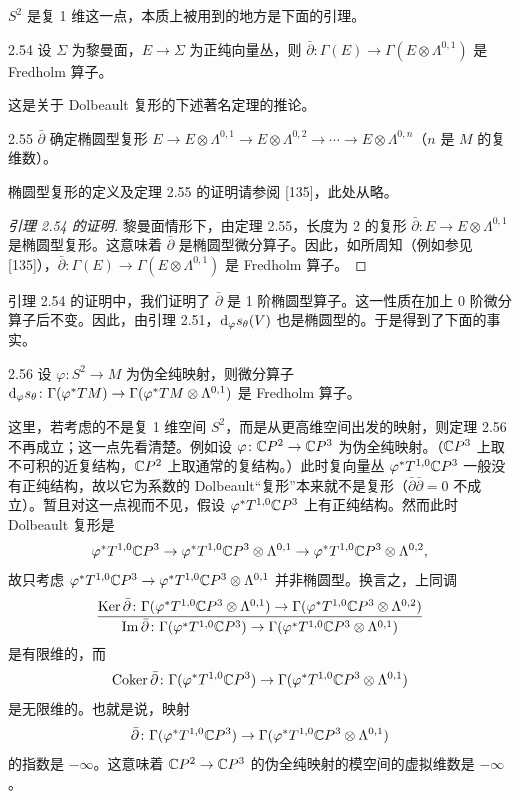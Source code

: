 $S^2$ 是复 1 维这一点，本质上被用到的地方是下面的引理。

\begin{lemma}{2.54}
  设 $\Sigma$ 为黎曼面，$E\to\Sigma$ 为正纯向量丛，则 $\bar\partial\colon\Gamma(E)\to\Gamma(E\otimes\Lambda^{0,1})$ 是 Fredholm 算子。
\end{lemma}

这是关于 Dolbeault 复形的下述著名定理的推论。

\begin{theorem}{2.55}
  $\bar\partial$ 确定椭圆型复形 $E\to E\otimes\Lambda^{0,1}\to E\otimes\Lambda^{0,2}\to\cdots\to E\otimes\Lambda^{0,n}$（$n$ 是 $M$ 的复维数）。
\end{theorem}

椭圆型复形的定义及定理 2.55 的证明请参阅 [135]，此处从略。

\begin{proof}[引理 2.54 的证明]
  黎曼面情形下，由定理 2.55，长度为 2 的复形 $\bar\partial\colon E\to E\otimes\Lambda^{0,1}$ 是椭圆型复形。这意味着 $\bar\partial$ 是椭圆型微分算子。因此，如所周知（例如参见 [135]），$\bar\partial\colon\Gamma(E)\to\Gamma(E\otimes\Lambda^{0,1})$ 是 Fredholm 算子。
\end{proof}

引理 2.54 的证明中，我们证明了 $\bar\partial$ 是 1 阶椭圆型算子。这一性质在加上 0 阶微分算子后不变。因此，由引理 2.51，$\mathrm{d}_\varphi s_\theta(V)$ 也是椭圆型的。于是得到了下面的事实。

\begin{theorem}{2.56}
  设 $\varphi\colon S^2\to M$ 为伪全纯映射，则微分算子 $\mathrm{d}_\varphi s_\theta\colon\Gamma(\varphi^*TM)\to\Gamma(\varphi^*TM\otimes\Lambda^{0,1})$ 是 Fredholm 算子。
\end{theorem}

这里，若考虑的不是复 1 维空间 $S^2$，而是从更高维空间出发的映射，则定理 2.56 不再成立；这一点先看清楚。例如设 $\varphi\colon\mathbb{C}P^2\to\mathbb{C}P^3$ 为伪全纯映射。（$\mathbb{C}P^3$ 上取不可积的近复结构，$\mathbb{C}P^2$ 上取通常的复结构。）此时复向量丛 $\varphi^*T^{1,0}\mathbb{C}P^3$ 一般没有正纯结构，故以它为系数的 Dolbeault“复形”本来就不是复形（$\bar\partial\bar\partial=0$ 不成立）。暂且对这一点视而不见，假设 $\varphi^*T^{1,0}\mathbb{C}P^3$ 上有正纯结构。然而此时 Dolbeault 复形是
\[
  \varphi^*T^{1,0}\mathbb{C}P^3\to\varphi^*T^{1,0}\mathbb{C}P^3\otimes\Lambda^{0,1}\to\varphi^*T^{1,0}\mathbb{C}P^3\otimes\Lambda^{0,2},
\]
故只考虑 $\varphi^*T^{1,0}\mathbb{C}P^3\to\varphi^*T^{1,0}\mathbb{C}P^3\otimes\Lambda^{0,1}$ 并非椭圆型。换言之，上同调
\[
  \frac{\operatorname{Ker}\bar\partial\colon\Gamma(\varphi^*T^{1,0}\mathbb{C}P^3\otimes\Lambda^{0,1})\to\Gamma(\varphi^*T^{1,0}\mathbb{C}P^3\otimes\Lambda^{0,2})}{\operatorname{Im}\bar\partial\colon\Gamma(\varphi^*T^{1,0}\mathbb{C}P^3)\to\Gamma(\varphi^*T^{1,0}\mathbb{C}P^3\otimes\Lambda^{0,1})}
\]
是有限维的，而
\[
  \operatorname{Coker}\bar\partial\colon\Gamma(\varphi^*T^{1,0}\mathbb{C}P^3)\to\Gamma(\varphi^*T^{1,0}\mathbb{C}P^3\otimes\Lambda^{0,1})
\]
是无限维的。也就是说，映射
\[
  \bar\partial\colon\Gamma(\varphi^*T^{1,0}\mathbb{C}P^3)\to\Gamma(\varphi^*T^{1,0}\mathbb{C}P^3\otimes\Lambda^{0,1})
\]
的指数是 $-\infty$。这意味着 $\mathbb{C}P^2\to\mathbb{C}P^3$ 的伪全纯映射的模空间的虚拟维数是 $-\infty$。

